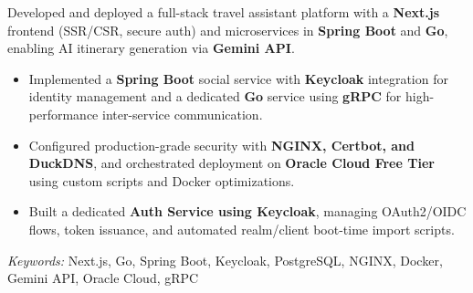 \nointent 
{}
 
\nointent 
Developed and deployed a full-stack travel assistant platform with a \textbf{Next.js} frontend (SSR/CSR, secure auth) and microservices in \textbf{Spring Boot} and \textbf{Go}, enabling AI itinerary generation via \textbf{Gemini API}. 

\begin{itemize} 
    \item Implemented a \textbf{Spring Boot} social service with \textbf{Keycloak} integration for identity management and a dedicated \textbf{Go} service using \textbf{gRPC} for high-performance inter-service communication. 
    \item Configured production-grade security with \textbf{NGINX, Certbot, and DuckDNS}, and orchestrated deployment on \textbf{Oracle Cloud Free Tier} using custom scripts and Docker optimizations. 
    \item Built a dedicated \textbf{Auth Service using Keycloak}, managing OAuth2/OIDC flows, token issuance, and automated realm/client boot-time import scripts. 
\end{itemize} 
 
\nointent 
\textit{Keywords:} Next.js, Go, Spring Boot, Keycloak, PostgreSQL, NGINX, Docker, Gemini API, Oracle Cloud, gRPC 
